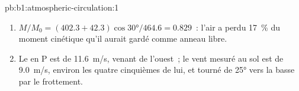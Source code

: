 \begin{solution}{pb:b1:atmospheric-circulation:1}
\begin{enumerate}
        ailleurs~; et l'air de la cellule monte sur une bande de  plutôt
        qu'au repos à l'équateur. La moyenne zonale moyenne aussi un  sinueux
        sur toutes les .
  \item $M/M_0 = (402.3 + 42.3)\cos\ang{30}/464.6 = 0.829$~: l'air a perdu
        \qty{17}{\percent} du moment cinétique qu'il aurait gardé comme anneau libre.
  \item Le  en P est de \qty{11.6}{m/s}, venant de l'ouest~; le vent
        mesuré au sol est de \qty{9.0}{m/s}, environ les quatre cinquièmes de lui, et tourné de
        \ang{25} vers la basse par le frottement.
\end{enumerate}
\end{solution}
